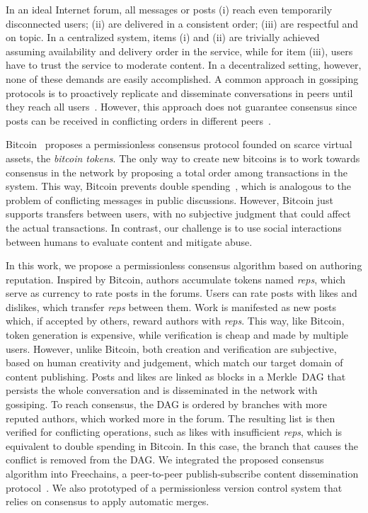 \documentclass[10pt,journal,compsoc]{IEEEtran}
\newcommand{\reps}     {\emph{reps}\xspace}
\begin{document}
In an ideal Internet forum, all messages or posts
(i)   reach even temporarily disconnected users;
(ii)  are delivered in a consistent order;
(iii) are respectful and on topic.
In a centralized system, items (i) and (ii) are trivially achieved assuming
availability and delivery order in the service, while for item (iii), users
have to trust the service to moderate content.
In a decentralized setting, however, none of these demands are easily
accomplished.
A common approach in gossiping protocols is to proactively replicate and
disseminate conversations in peers until they reach all
users~\cite{p2p.survey}.
However, this approach does not guarantee consensus since posts can be received
in conflicting orders in different peers~\cite{p2p.intention}.

Bitcoin~\cite{p2p.bitcoin} proposes a permissionless consensus protocol founded
on scarce virtual assets, the \emph{bitcoin tokens}.
%
The only way to create new bitcoins is to work towards consensus in the network
by proposing a total order among transactions in the system.
%
This way, Bitcoin prevents double spending~\cite{p2p.bitcoin}, which is
analogous to the problem of conflicting messages in public discussions.
%
However, Bitcoin just supports transfers between users, with no subjective
judgment that could affect the actual transactions.
In contrast, our challenge is to use social interactions between humans to
evaluate content and mitigate abuse.

In this work, we propose a permissionless consensus algorithm based on
authoring reputation.
Inspired by Bitcoin, authors accumulate tokens named \reps, which serve as
currency to rate posts in the forums.
Users can rate posts with likes and dislikes, which transfer \reps between
them.
Work is manifested as new posts which, if accepted by others, reward authors
with \reps.
This way, like Bitcoin, token generation is expensive, while verification is
cheap and made by multiple users.
However, unlike Bitcoin, both creation and verification are subjective, based
on human creativity and judgement, which match our target domain of content
publishing.
Posts and likes are linked as blocks in a Merkle~DAG that persists the whole
conversation and is disseminated in the network with gossiping.
To reach consensus, the DAG is ordered by branches with more reputed authors,
which worked more in the forum.
The resulting list is then verified for conflicting operations, such as likes
with insufficient \reps, which is equivalent to double spending in Bitcoin.
In this case, the branch that causes the conflict is removed from the DAG.
%
We integrated the proposed consensus algorithm into Freechains, a peer-to-peer
publish-subscribe content dissemination protocol~\cite{fcs.sbseg20}.
We also prototyped of a permissionless version control system that relies on
consensus to apply automatic merges.
\end{document}
